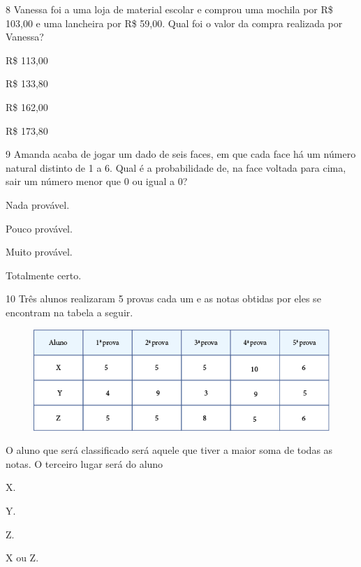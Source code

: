 \num{8} Vanessa foi a uma loja de material escolar e comprou uma mochila por R\$ 103,00 e uma lancheira por R\$ 59,00. Qual foi o valor da compra realizada por Vanessa?

\begin{multicols}{2}
\begin{escolha}
\item
  R\$ 113,00
\item
  R\$ 133,80
\item
  R\$ 162,00
\item
  R\$ 173,80
\end{escolha}
\end{multicols}


\num{9} Amanda acaba de jogar um dado de seis faces, em que cada face
há um número natural distinto de 1 a 6. Qual é a probabilidade de, na
face voltada para cima, sair um número menor que 0 ou igual a 0?

\begin{multicols}{2}
\begin{escolha}
\item
  Nada provável.
\item
  Pouco provável.
\item
  Muito provável.
\item
  Totalmente certo.
\end{escolha}
\end{multicols}

\num{10} Três alunos realizaram 5 provas cada um e as notas obtidas por eles se
encontram na tabela a seguir.

\begin{figure}[htpb!]
\centering
\includegraphics[width=\textwidth]{media/image82.png}
\end{figure}

O aluno que será classificado será aquele que tiver a maior
soma de todas as notas. O terceiro lugar será do aluno

\begin{multicols}{2}
\begin{escolha}
\item
  X.
\item
  Y.
\item
  Z.
\item
  X ou Z.
\end{escolha}
\end{multicols}

